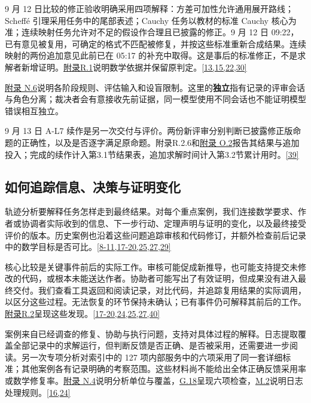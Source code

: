 9 月 12 日比较的修正验收明确采用四项解释：方差可加性允许通用展开路线；Scheffé 引理采用任务中的尾部表述；Cauchy 任务以教材的标准 Cauchy 核心为准；连续映射任务允许对不足的假设作合理且已披露的修正。9 月 12 日 09:22，已有意见被复用，可确定的格式不匹配被修复，并按这些标准重新合成结果。连续映射的两份追加意见此前已在 05:17 的补充中取得。这是事后的标准修正，不是求解者新增证明。\href{zh-appendix.pdf\#r1}{附录R.1}说明数学依据并保留原判定。\hyperlink{ref-13}{\mbox{[13,15,22,30]}}

\href{zh-appendix.pdf\#n6}{附录 N.6}说明各阶段规则、评估输入和设盲限制。这里的\textbf{独立}指有记录的评审会话与角色分离；裁决者会有意接收先前证据，同一模型使用不同会话也不能证明模型错误相互独立。

9 月 13 日 A-L7 续作是另一次交付与评价。两份新评审分别判断已披露修正版命题的正确性，以及是否逐字满足原命题。附录R.2.6和\href{zh-appendix.pdf\#o2}{附录 O.2}报告其结果与追加投入；完成的续作计入第3.1节结果表，追加求解时间计入第3.2节累计用时。\hyperlink{ref-39}{\mbox{[39]}}

\subsection[如何追踪信息、决策与证明变化]{\texorpdfstring{\protect\hypertarget{section-2-5}{}如何追踪信息、决策与证明变化}{如何追踪信息、决策与证明变化}}
轨迹分析要解释任务怎样走到最终结果。对每个重点案例，我们连接数学要求、作者或协调者实际收到的信息、下一步行动、定理声明与证明的变化，以及最终接受评价的版本。历史案例也沿着这些问题追踪审核和代码修订，并额外检查前后记录中的数学目标是否可比。\hyperlink{ref-8}{\mbox{[8-11,17-20,25,27,29]}}

核心比较是关键事件前后的实际工作。审核可能促成新推导，也可能支持提交未修改的代码，或根本未能送达作者。协助者可能写出了有效证明，但成果没有进入最终交付。我们查看工具返回和阅读记录，对比代码，并追踪复用结果的实际调用，以区分这些过程。无法恢复的环节保持未确认；已有事件仍可解释其前后的工作。\href{zh-appendix.pdf\#r2}{附录R.2}呈现这些发现。\hyperlink{ref-17}{\mbox{[17-20,24,25,27,40]}}

案例来自已经调查的修复、协助与执行问题，支持对具体过程的解释。日志提取覆盖全部记录中的求解运行，但判断反馈是否正确、是否被采用，还需要进一步阅读。另一次专项分析对索引中的 127 项内部服务中的六项采用了同一套详细标准；其他案例各有记录明确的考察范围。这些材料尚不能给出全体正确反馈采用率或数学修复率。\href{zh-appendix.pdf\#n4}{附录 N.4}说明分析单位与覆盖，\href{zh-appendix.pdf\#g18}{G.18}呈现六项检查，\href{zh-appendix.pdf\#m2}{M.2}说明日志处理规则。\hyperlink{ref-16}{\mbox{[16,24]}}

